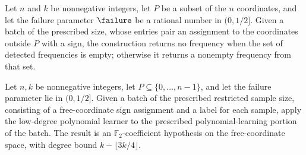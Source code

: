 \begin{definition}
\label{FABL.firstLowDegreeJuntaDetectedFrequency}
\leanok
{}
Let $n$ and $k$ be nonnegative integers, let $P$ be a subset of the $n$ coordinates, and
let the failure parameter $\failure$ be a rational number in $(0,1/2]$. Given a batch of
the prescribed size, whose entries pair an assignment to the coordinates outside $P$
with a sign, the construction returns no frequency when the set of detected frequencies
is empty; otherwise it returns a nonempty frequency from that set.
\end{definition}

\begin{definition}
\label{FABL.lowDegreeJuntaPolynomialHypothesis}
\leanok
{}
Let $n,k$ be nonnegative integers, let $P\subseteq\{0,\ldots,n-1\}$, and let the failure
parameter lie in $(0,1/2]$. Given a batch of the prescribed restricted sample size,
consisting of a free-coordinate sign assignment and a label for each sample, apply the
low-degree polynomial learner to the prescribed polynomial-learning portion of the
batch. The result is an $\mathbb{F}_2$-coefficient hypothesis on the free-coordinate
space, with degree bound $k-\lfloor 3k/4\rfloor$.
\end{definition}

